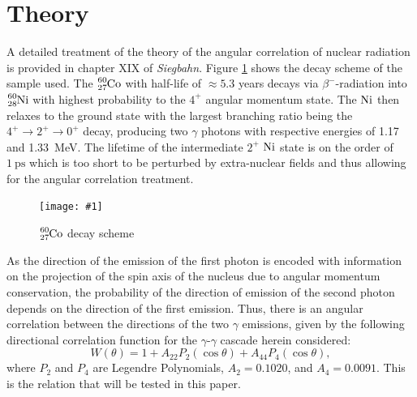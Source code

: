 \documentclass[twocolumn]{article}
\newcommand{\insertFigure}[1]{%
   \texttt{[image: \#1]}%
}
\begin{document}
\section{Theory}
A detailed treatment of the theory of the angular correlation of nuclear radiation is provided in chapter XIX of \textsl{Siegbahn}.\cite{sieg}
 Figure \ref{fig:cobalt_scheme} shows the decay scheme of the sample used. The $\ce{_27^{60}Co}$ with half-life of $\approx 5.3$ years decays via $\beta^-$-radiation into $\ce{_28^{60}Ni}$ with highest probability to the $4^+$ angular momentum state. The $\ce{Ni}$ then relaxes to the ground state with the largest branching ratio being the $4^+\rightarrow2^+\rightarrow 0^+$ decay, producing two $\gamma$ photons with respective energies of 1.17 and 1.33~MeV. The lifetime of the intermediate $2^+$ $\ce{Ni}$ state is on the order of $\SI{1}{\pico\second}$ which is too short to be perturbed by extra-nuclear fields and thus allowing for the angular correlation treatment.
\begin{figure}[!h]
\centering
\insertFigure{cobalt_scheme.png}
\caption{$\ce{_27^{60}Co}$ decay scheme \cite{cobalt_scheme}}
\label{fig:cobalt_scheme}
\end{figure}
As the direction of the emission of the first photon is encoded with information on the projection of the spin axis of the nucleus due to angular momentum conservation, the probability of the direction of emission of the second photon depends on the direction of the first emission. Thus, there is an angular correlation between the directions of the two $\gamma$ emissions, given by the following directional correlation function for the $\gamma$-$\gamma$ cascade herein considered:
\begin{equation}
W(\theta) = 1+A_{22}P_2(\cos{\theta})+A_{44}P_4(\cos{\theta}), \label{eq:corr}
\end{equation}
where $P_2$ and $P_4$ are Legendre Polynomials, $A_2 = 0.1020$, and $A_4 = 0.0091$.\cite{sieg} This is the relation that will be tested in this paper.
\end{document}
